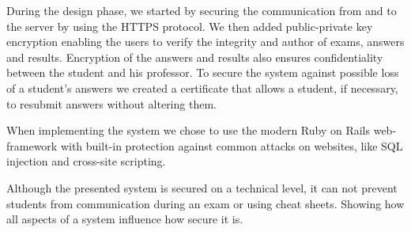 \documentclass[12pt]{article}
\begin{document}
During the design phase, we started by securing the communication from and to
the server by using the HTTPS protocol. We then added public-private key
encryption enabling the users to verify the integrity and author of exams,
answers and results. Encryption of the answers and results also ensures
confidentiality between the student and his professor. To secure the system
against possible loss of a student's answers we created a certificate that
allows a student, if necessary, to resubmit answers without altering them.

When implementing the system we chose to use the modern Ruby on Rails
web-framework with built-in protection against common attacks on websites,
like SQL injection and cross-site scripting.

Although the presented system is secured on a technical level, it can not
prevent students from communication during an exam or using cheat sheets.
Showing how all aspects of a system influence how secure it is.
\end{document}

